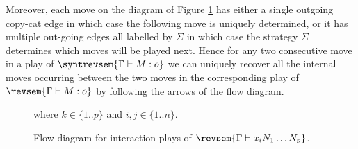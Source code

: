     Moreover, each move on the diagram of Figure \ref{fig:flowdiag_moves_interplay_varcase} has either a single outgoing copy-cat edge in which case the following move is uniquely determined, or it has multiple out-going edges all labelled by $\Sigma$ in which case the strategy $\Sigma$ determines which moves will be played next.
    Hence for any two consecutive move in a play of $\syntrevsem{\Gamma \vdash M : o}$ we can uniquely recover all the internal moves occurring between the two moves in the corresponding play of $\revsem{\Gamma \vdash M : o}$ by following the arrows of the flow diagram.
    \begin{figure}
    where $k\in\{1..p\}$ and $i,j \in \{1..n\}$.
    \caption{Flow-diagram for interaction plays of $\revsem{\Gamma \vdash x_i N_1 \ldots N_p}$.}
    \label{fig:flowdiag_moves_interplay_varcase}
    \end{figure}


